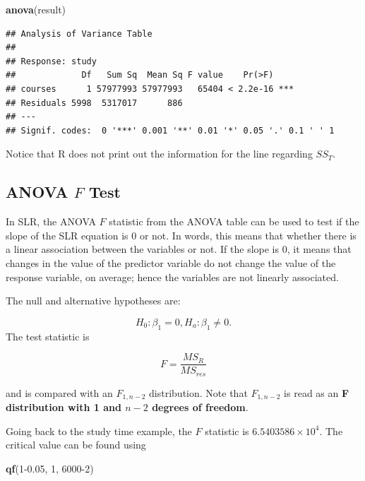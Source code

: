 \documentclass[
]{book}
\newenvironment{Shaded}{\begin{snugshade}}{\end{snugshade}}
\newcommand{\DecValTok}[1]{\textcolor[rgb]{0.00,0.00,0.81}{#1}}
\newcommand{\FloatTok}[1]{\textcolor[rgb]{0.00,0.00,0.81}{#1}}
\newcommand{\FunctionTok}[1]{\textcolor[rgb]{0.13,0.29,0.53}{\textbf{#1}}}
\newcommand{\NormalTok}[1]{#1}
\begin{document}
\begin{Shaded}
\begin{Highlighting}[]
\FunctionTok{anova}\NormalTok{(result)}
\end{Highlighting}
\end{Shaded}

\begin{verbatim}
## Analysis of Variance Table
## 
## Response: study
##             Df   Sum Sq  Mean Sq F value    Pr(>F)    
## courses      1 57977993 57977993   65404 < 2.2e-16 ***
## Residuals 5998  5317017      886                      
## ---
## Signif. codes:  0 '***' 0.001 '**' 0.01 '*' 0.05 '.' 0.1 ' ' 1
\end{verbatim}

Notice that R does not print out the information for the line regarding \(SS_T\).

\hypertarget{anova-f-test}{%
\subsection{\texorpdfstring{ANOVA \(F\) Test}{ANOVA F Test}}\label{anova-f-test}}

In SLR, the ANOVA \(F\) statistic from the ANOVA table can be used to test if the slope of the SLR equation is 0 or not. In words, this means that whether there is a linear association between the variables or not. If the slope is 0, it means that changes in the value of the predictor variable do not change the value of the response variable, on average; hence the variables are not linearly associated.

The null and alternative hypotheses are:

\[
H_0: \beta_1 = 0, H_a: \beta_1 \neq 0.
\]
The test statistic is

\begin{equation} 
F = \frac{MS_R}{MS_{res}}
\label{eq:ANOVA}
\end{equation}

and is compared with an \(F_{1,n-2}\) distribution. Note that \(F_{1,n-2}\) is read as an \textbf{F distribution with 1 and \(n-2\) degrees of freedom}.

Going back to the study time example, the \(F\) statistic is \ensuremath{6.5403586\times 10^{4}}. The critical value can be found using

\begin{Shaded}
\begin{Highlighting}[]
\FunctionTok{qf}\NormalTok{(}\DecValTok{1}\FloatTok{{-}0.05}\NormalTok{, }\DecValTok{1}\NormalTok{, }\DecValTok{6000{-}2}\NormalTok{)}
\end{Highlighting}
\end{Shaded}
\end{document}
